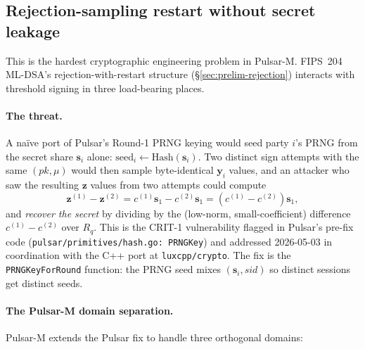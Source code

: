 \documentclass[11pt,a4paper]{article}
\theoremstyle{definition}
\theoremstyle{remark}
\newcommand{\Rq}{R_q}
\begin{document}
\subsection{Rejection-sampling restart without secret leakage}
\label{sec:impl-rejection-restart}

This is the hardest cryptographic engineering problem in Pulsar-M.
FIPS~204 ML-DSA's rejection-with-restart structure (\S\ref{sec:prelim-rejection})
interacts with threshold signing in three load-bearing places.

\paragraph{The threat.}
A na\"ive port of Pulsar's Round-1 PRNG keying would seed party
$i$'s PRNG from the secret share $\mathbf{s}_i$ alone:
\(
\text{seed}_i \gets \text{Hash}(\mathbf{s}_i)
\).
Two distinct sign attempts with the same $(\mathit{pk}, \mu)$ would
then sample byte-identical $\mathbf{y}_i$ values, and an attacker
who saw the resulting $\mathbf{z}$ values from two attempts could
compute
\[
\mathbf{z}^{(1)} - \mathbf{z}^{(2)} = c^{(1)} \mathbf{s}_1 - c^{(2)} \mathbf{s}_1
= (c^{(1)} - c^{(2)}) \mathbf{s}_1,
\]
and \emph{recover the secret} by dividing by the (low-norm,
small-coefficient) difference $c^{(1)} - c^{(2)}$ over $\Rq$. This is
the CRIT-1 vulnerability flagged in Pulsar's pre-fix code
(\texttt{pulsar/primitives/hash.go: PRNGKey}) and addressed
2026-05-03 in coordination with the C++ port at
\texttt{luxcpp/crypto}. The fix is the
\texttt{PRNGKeyForRound} function: the PRNG seed mixes
$(\mathbf{s}_i, \mathit{sid})$ so distinct sessions get distinct
seeds.

\paragraph{The Pulsar-M domain separation.}
Pulsar-M extends the Pulsar fix to handle three orthogonal
domains:
\end{document}

